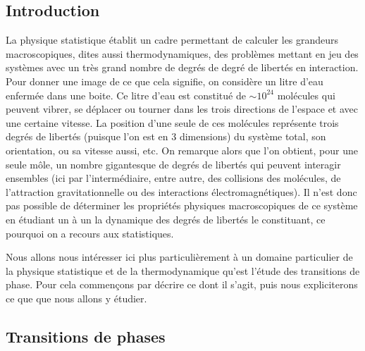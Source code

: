 \documentclass[10pt]{article}
\begin{document}

\tableofcontents

\pagebreak
\begin{multicols}{2}

\section{Introduction}

La physique statistique établit un cadre permettant de calculer les grandeurs macroscopiques, dites aussi thermodynamiques, des problèmes mettant en jeu des systèmes avec un très grand nombre de degrés de degré de libertés en interaction. Pour donner une image de ce que cela signifie, on considère un litre d'eau enfermée dans une boite. Ce litre d'eau est constitué de $\sim 10^{24}$ molécules qui peuvent vibrer, se déplacer ou tourner dans les trois directions de l'espace et avec une certaine vitesse. La position d'une seule de ces molécules représente trois degrés de libertés (puisque l'on est en 3 dimensions) du système total, son orientation, ou sa vitesse aussi, etc. On remarque alors que l'on obtient, pour une seule môle, un nombre gigantesque de degrés de libertés qui peuvent interagir ensembles (ici par l'intermédiaire, entre autre, des collisions des molécules, de l'attraction gravitationnelle ou des interactions électromagnétiques). Il n'est donc pas possible de déterminer les propriétés physiques macroscopiques de ce système en étudiant un à un la dynamique des degrés de libertés le constituant, ce pourquoi on a recours aux statistiques. 

Nous allons nous intéresser ici plus particulièrement à un domaine particulier de la physique statistique et de la thermodynamique qu'est l'étude des transitions de phase. Pour cela commençons par décrire ce dont il s'agit, puis nous expliciterons ce que que nous allons y étudier. \\


\subsection{Transitions de phases}


\end{multicols}
\end{document}
